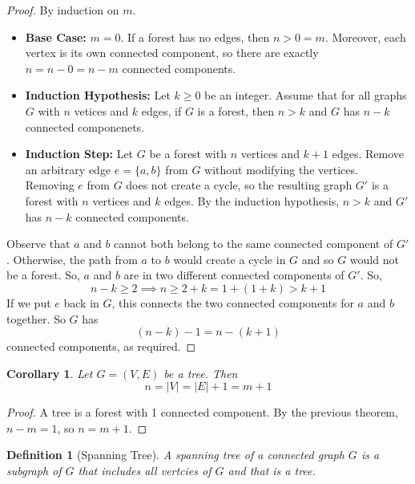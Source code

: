 \documentclass[openany]{report}
\newtheorem{definition}{Definition}[section]
\newtheorem{corollary}{Corollary}[section]
\begin{document}
\begin{proof}
    By induction on $m$.
    \begin{itemize}
        \item \textbf{Base Case:} $m = 0$. If a forest has no edges, then $n > 0 = m$. Moreover, each vertex is its own connected component, so there are exactly $n = n - 0 = n-m$ connected components.
        \item \textbf{Induction Hypothesis:} Let $k \geq 0$ be an integer. Assume that for all graphs $G$ with $n$ vetices and $k$ edges, if $G$ is a forest, then $n >k$ and $G$ has $n-k$ connected componenets.
        \item \textbf{Induction Step:} Let $G$ be a forest with $n$ vertices and $k+1$ edges. Remove an arbitrary edge $e = \{a,b\}$ from $G$ without modifying the vertices. Removing $e$ from $G$ does not create a cycle, so the resulting graph $G'$ is a forest with $n$ vertices and $k$ edges. By the induction hypothesis, $n>k$ and $G'$ has $n-k$ connected components. 
    \end{itemize}
    Observe that $a$ and $b$ cannot both belong to the same connected component of $G'$. Otherwise, the path from $a$ to $b$ would create a cycle in $G$ and so $G$ would not be a forest. So, $a$ and $b$ are in two different connected components of $G'$. So, 
    \[n -k \geq 2 \implies n \geq 2 + k = 1 + (1 + k ) > k + 1\]
    If we put $e$ back in $G$, this connects the two connected components for $a$ and $b$ together. So $G$ has 
    \[(n-k)-1 = n - (k+1)\]
    connected components, as required.
\end{proof}
\begin{corollary}
    Let $G = (V,E)$ be a tree. Then
    \[n = |V| = |E| + 1 = m + 1\]
\end{corollary}
\begin{proof}
    A tree is a forest with 1 connected component. By the previous theorem, $n - m =1$, so $n = m + 1$.
\end{proof}
\begin{definition}[Spanning Tree]
    A \emph{spanning tree} of a connected graph $G$ is a subgraph of $G$ that includes all vertcies of $G$ and that is a tree.
\end{definition}

\end{document}
